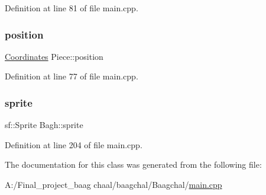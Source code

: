 Definition at line 81 of file main.\+cpp.

\mbox{\label{class_piece_a3a789618e64cb8139a2bc79f44bb6edb}} 
\subsubsection{\texorpdfstring{position}{position}}
{\footnotesize\ttfamily \mbox{\hyperlink{class_coordinates}{Coordinates}} Piece\+::position\hspace{0.3cm}{\ttfamily [inherited]}}



Definition at line 77 of file main.\+cpp.

\mbox{\label{class_bagh_ad8af00ee831b82cea1df1f801a1d77c7}} 
\subsubsection{\texorpdfstring{sprite}{sprite}}
{\footnotesize\ttfamily sf\+::\+Sprite Bagh\+::sprite\hspace{0.3cm}{\ttfamily [static]}}



Definition at line 204 of file main.\+cpp.



The documentation for this class was generated from the following file\+:\begin{DoxyCompactItemize}
\item 
A\+:/\+Final\+\_\+project\+\_\+baag chaal/baagchal/\+Baagchal/\mbox{\hyperlink{main_8cpp}{main.\+cpp}}\end{DoxyCompactItemize}
